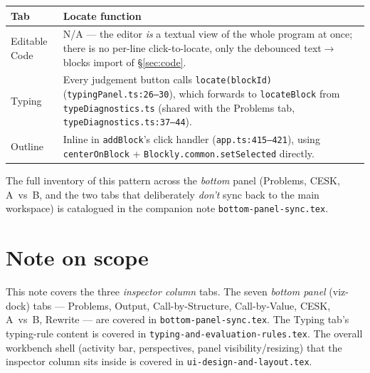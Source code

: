 \documentclass[11pt]{article}
\begin{document}
\begin{center}
\begin{longtable}{@{}p{3.4cm}p{10.8cm}@{}}
\toprule
\textbf{Tab} & \textbf{Locate function} \\
\midrule
\endhead
Editable Code &
  N/A --- the editor \emph{is} a textual view of the whole program at
  once; there is no per-line click-to-locate, only the debounced
  text$\to$blocks import of \S\ref{sec:code}. \\
Typing &
  Every judgement button calls \texttt{locate(blockId)}
  (\texttt{typingPanel.ts:26--30}), which forwards to
  \texttt{locateBlock} from \texttt{typeDiagnostics.ts} (shared with the
  Problems tab, \texttt{typeDiagnostics.ts:37--44}). \\
Outline &
  Inline in \texttt{addBlock}'s click handler
  (\texttt{app.ts:415--421}), using \texttt{centerOnBlock} +
  \texttt{Blockly.common.setSelected} directly. \\
\bottomrule
\end{longtable}
\end{center}

The full inventory of this pattern across the \emph{bottom} panel
(Problems, CESK, A~vs~B, and the two tabs that deliberately \emph{don't}
sync back to the main workspace) is catalogued in the companion note
\texttt{bottom-panel-sync.tex}.

\section*{Note on scope}
This note covers the three \emph{inspector column} tabs. The seven
\emph{bottom panel} (viz-dock) tabs --- Problems, Output, Call-by-Structure,
Call-by-Value, CESK, A~vs~B, Rewrite --- are covered in
\texttt{bottom-panel-sync.tex}. The Typing tab's typing-rule content is
covered in \texttt{typing-and-evaluation-rules.tex}. The overall workbench
shell (activity bar, perspectives, panel visibility/resizing) that the
inspector column sits inside is covered in \texttt{ui-design-and-layout.tex}.
\end{document}
